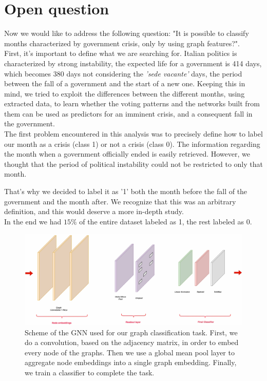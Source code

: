 




\section{Open question}
Now we would like to address the following question: "It is possible to classify months characterized by government crisis, only by using graph features?".\\
First, it's important to define what we are searching for. Italian politics is characterized by strong instability, the expected life for a government is 414 days, which becomes 380 days not considering the \textit{'sede vacante'} days, the period between the fall of a government and the start of a new one. Keeping this in mind, we tried to exploit the differences between the different months, using extracted data, to learn whether the voting patterns and the networks built from them can be used as predictors for an imminent crisis, and a consequent fall in the government.\\

The first problem encountered in this analysis was to precisely define how to label our month as a crisis (class 1) or not a crisis (class 0). 
The information regarding the month when a government officially ended is easily retrieved. However, we thought that the period of political instability could not be restricted to only that month.

That's why we decided to label it as '1' both the month before the fall of the government and the month after. We recognize that this was an arbitrary definition, and this would deserve a more in-depth study.\\
In the end we had $15\%$ of the entire dataset labeled as 1, the rest labeled as 0.\\

\begin{figure}[h]
  \centering
  \includegraphics[width=0.9\linewidth]{img/nn scheme.png}
  \caption{Scheme of the GNN used for our graph classification task. First, we do a convolution, based on the adjacency matrix, in order to embed every node of the graphs. Then we use a global mean pool layer to aggregate node embeddings into a single graph embedding. Finally, we train a classifier to complete the task.}
  \label{fig:nn}
\end{figure}

